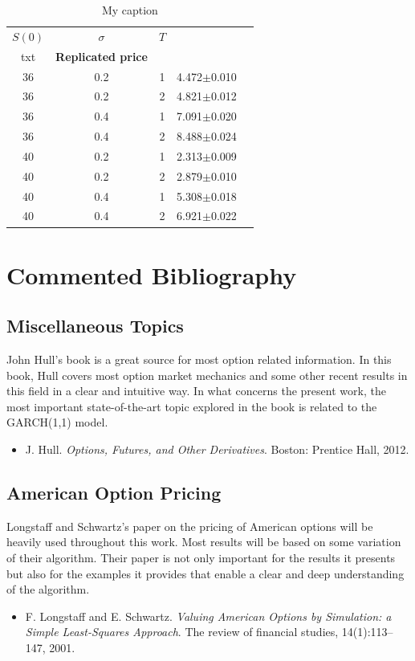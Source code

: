 \documentclass[a4paper,twocolumn,aps,prd,longbibliography,superscriptaddress]{revtex4-1}
\begin{document}
\begin{table}[H]
\centering
\begin{tabular}{|c|c|c|c|c|}
\hline
\textbf{$S(0)$} & \textbf{$\sigma$} & \textbf{$T$} & \thead{\textbf{Original price}\\txt} & \textbf{Replicated price} \\ \hline
36 & 0.2 & 1 & 4.472$\pm$0.010 &  \\ \hline
36 & 0.2 & 2 & 4.821$\pm$0.012 &  \\ \hline
36 & 0.4 & 1 & 7.091$\pm$0.020 &  \\ \hline
36 & 0.4 & 2 & 8.488$\pm$0.024 &  \\ \hline
40 & 0.2 & 1 & 2.313$\pm$0.009 &  \\ \hline
40 & 0.2 & 2 & 2.879$\pm$0.010 &  \\ \hline
40 & 0.4 & 1 & 5.308$\pm$0.018 &  \\ \hline
40 & 0.4 & 2 & 6.921$\pm$0.022 &  \\ \hline
\end{tabular}
\caption{My caption}
\label{tab:LS}
\end{table}

\section{Commented Bibliography}
\subsection{Miscellaneous Topics}

John Hull's book is a great source for most option related information. In this book, Hull covers most option market mechanics and some other recent results in this field in a clear and intuitive way.
In what concerns the present work, the most important state-of-the-art topic explored in the book is related to the GARCH(1,1) model.
\begin{itemize}
\item J. Hull. \textit{Options, Futures, and Other Derivatives}. Boston: Prentice Hall, 2012.
\end{itemize}

\subsection{American Option Pricing}
Longstaff and Schwartz's paper on the pricing of American options will be heavily used throughout this work. Most results will be based on some variation of their algorithm. Their paper is not only important for the results it presents but also for the examples it provides that enable a clear and deep understanding of the algorithm.
\begin{itemize}
\item  F. Longstaff and E. Schwartz. \textit{Valuing American Options by Simulation: a Simple Least-Squares Approach}. The review of financial studies, 14(1):113–147, 2001.
\end{itemize}
\end{document}
